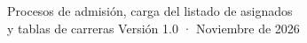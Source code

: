 \documentclass[11pt,letterpaper,oneside]{report}
\begin{document}
  {Procesos de admisión, carga del listado de asignados\\y tablas de carreras}
  {Versión 1.0 · Noviembre de 2026}

\tableofcontents




\end{document}
